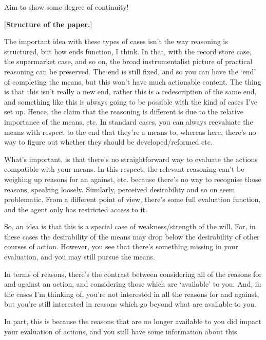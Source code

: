 \documentclass[10pt]{article}
\begin{document}
Aim to show some degree of continuity!


\begin{center}
  [\textbf{Structure of the paper.}]
\end{center}

\newpage

The important idea with these types of cases isn't the way reasoning is structured, but how ends function, I think.
In that, with the record store case, the supermarket case, and so on, the broad instrumentalist picture of practical reasoning can be preserved.
The end is still fixed, and so you can have the `end' of completing the means, but this won't have much actionable content.
The thing is that this isn't really a new end, rather this is a redescription of the same end, and something like this is always going to be possible with the kind of cases I've set up.
Hence, the claim that the reasoning is different is due to the relative importance of the means, etc.
In standard cases, you can always reevaluate the means with respect to the end that they're a means to, whereas here, there's no way to figure out whether they should be developed/reformed etc.

What's important, is that there's no straightforward way to evaluate the actions compatible with your means.
In this respect, the relevant reasoning can't be weighing up reasons for an against, etc. because there's no way to recognise those reasons, speaking loosely.
Similarly, perceived desirability and so on seem problematic.
From a different point of view, there's some full evaluation function, and the agent only has restricted access to it.

So, an idea is that this is a special case of weakness/strength of the will.
For, in these cases the desirability of the means may drop below the desirability of other courses of action.
However, you see that there's something missing in your evaluation, and you may still pursue the means.

In terms of reasons, there's the contrast between considering all of the reasons for and against an action, and considering those which are `available' to you.
And, in the cases I'm thinking of, you're not interested in all the reasons for and against, but you're still interested in reasons which go beyond what are available to you.

In part, this is because the reasons that are no longer available to you did impact your evaluation of actions, and you still have some information about this.
\end{document}
